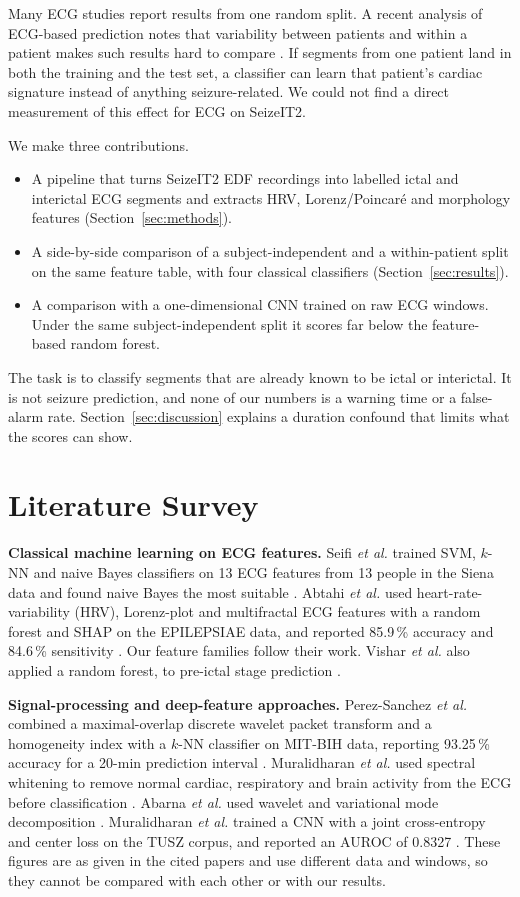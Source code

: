 \documentclass[conference,a4paper]{IEEEtran}
\begin{document}
Many ECG studies report results from one random split. A recent analysis of
ECG-based prediction notes that variability between patients and within a
patient makes such results hard to compare \cite{Kalousios2025}. If segments
from one patient land in both the training and the test set, a classifier
can learn that patient's cardiac signature instead of anything
seizure-related. We could not find a direct measurement of this effect for
ECG on SeizeIT2.

We make three contributions.
\begin{itemize}
\item A pipeline that turns SeizeIT2 EDF recordings into labelled ictal and
interictal ECG segments and extracts HRV, Lorenz/Poincar\'e and morphology
features (Section~\ref{sec:methods}).
\item A side-by-side comparison of a subject-independent and a
within-patient split on the same feature table, with four classical
classifiers (Section~\ref{sec:results}).
\item A comparison with a one-dimensional CNN trained on raw ECG windows.
Under the same subject-independent split it scores far below the
feature-based random forest.
\end{itemize}
The task is to classify segments that are already known to be ictal or
interictal. It is not seizure prediction, and none of our numbers is a
warning time or a false-alarm rate. Section~\ref{sec:discussion} explains a
duration confound that limits what the scores can show.

\section{Literature Survey}\label{sec:lit}
\textbf{Classical machine learning on ECG features.} Seifi \textit{et al.}
trained SVM, $k$-NN and naive Bayes classifiers on 13 ECG features from 13
people in the Siena data and found naive Bayes the most suitable
\cite{Seifi2022}. Abtahi \textit{et al.} used heart-rate-variability (HRV),
Lorenz-plot and multifractal ECG features with a random forest and SHAP on
the EPILEPSIAE data, and reported 85.9\,\% accuracy and 84.6\,\% sensitivity
\cite{Abtahi2025}. Our feature families follow their work. Vishar
\textit{et al.} also applied a random forest, to pre-ictal stage prediction
\cite{Vishar2024}.

\textbf{Signal-processing and deep-feature approaches.} Perez-Sanchez
\textit{et al.} combined a maximal-overlap discrete wavelet packet transform
and a homogeneity index with a $k$-NN classifier on MIT-BIH data, reporting
93.25\,\% accuracy for a 20-min prediction interval \cite{PerezSanchez2024}.
Muralidharan \textit{et al.} used spectral whitening to remove normal
cardiac, respiratory and brain activity from the ECG before classification
\cite{Muralidharan2025}. Abarna \textit{et al.} used wavelet and variational
mode decomposition \cite{Abarna2023}. Muralidharan \textit{et al.} trained a
CNN with a joint cross-entropy and center loss on the TUSZ corpus, and
reported an AUROC of 0.8327 \cite{Muralidharan2023}. These figures are as
given in the cited papers and use different data and windows, so they cannot
be compared with each other or with our results.
\end{document}
